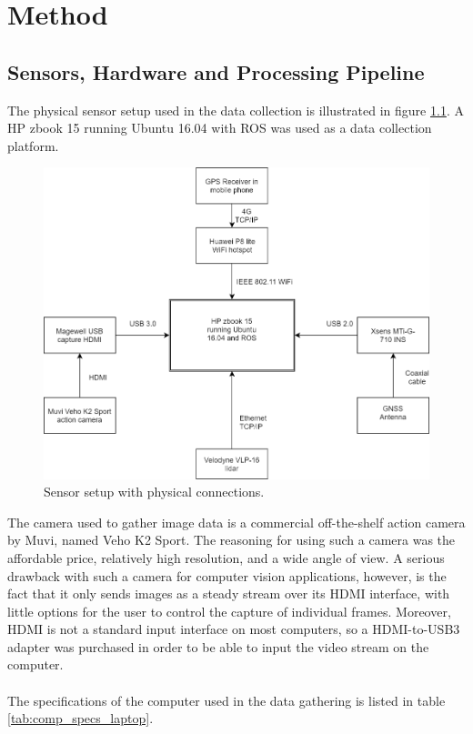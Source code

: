 
\chapter{Method}
\section{Sensors, Hardware and Processing Pipeline}
The physical sensor setup used in the data collection is illustrated in figure \ref{fig:sensor_setup}. A HP zbook 15 running Ubuntu 16.04 with ROS was used as a data collection platform.
\begin{figure}[H]
    \centering
    \includegraphics[width=.8\linewidth]{fig/sensor_setup.png}
    \caption{Sensor setup with physical connections.}
    \label{fig:sensor_setup}
\end{figure}
The camera used to gather image data is a commercial off-the-shelf action camera by Muvi, named Veho K2 Sport. The reasoning for using such a camera was the affordable price, relatively high resolution, and a wide angle of view. A serious drawback with such a camera for computer vision applications, however, is the fact that it only sends images as a steady stream over its HDMI interface, with little options for the user to control the capture of individual frames. Moreover, HDMI is not a standard input interface on most computers, so a HDMI-to-USB3 adapter was purchased in order to be able to input the video stream on the computer.\\
\vspace{2mm}\\
\noindent The specifications of the computer used in the data gathering is listed in table \ref{tab:comp_specs_laptop}.
